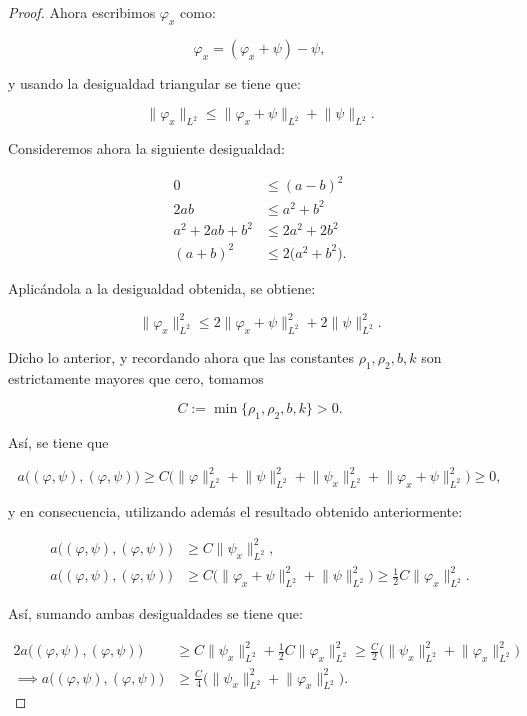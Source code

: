 \begin{proof}
    Ahora escribimos $\varphi_x$ como:

    \[\varphi_x = (\varphi_x + \psi) - \psi,\]

    y usando la desigualdad triangular se tiene que:

    \[\lVert \varphi_x \rVert_{L^2} \leq \lVert \varphi_x + \psi \rVert_{L^2} + \lVert \psi \rVert_{L^2}.\]

    Consideremos ahora la siguiente desigualdad:

    \begin{align*}
        0 &\leq (a - b)^2\\
        2ab &\leq a^2 + b^2\\
        a^2 + 2ab + b^2 &\leq 2a^2 + 2b^2\\
        (a+b)^2 &\leq 2\big(a^2 + b^2\big).
    \end{align*}

    Aplicándola a la desigualdad obtenida, se obtiene:

    \[\lVert \varphi_x \rVert^2_{L^2} \leq 2\lVert \varphi_x + \psi \rVert^2_{L^2} + 2\lVert \psi \rVert^2_{L^2}.\]

    Dicho lo anterior, y recordando ahora que las constantes $\rho_1, \rho_2, b, k$ son estrictamente mayores que cero, tomamos

    \[C := \min \{\rho_1, \rho_2, b, k\} > 0.\]

    Así, se tiene que

    \[a\big((\varphi, \psi), (\varphi, \psi)\big) \geq C \big( \lVert \varphi \rVert^2_{L^2} + \lVert \psi \rVert_{L^2}^2 + \lVert \psi_x \rVert^2_{L^2} + \lVert \varphi_x + \psi \rVert_{L^2}^2 \big) \geq 0,\]

    y en consecuencia, utilizando además el resultado obtenido anteriormente:

    \begin{align*}
        a\big((\varphi, \psi), (\varphi, \psi)\big) &\geq C \lVert \psi_x \rVert^2_{L^2},\\
        a\big((\varphi, \psi), (\varphi, \psi)\big) &\geq C\big(\lVert \varphi_x + \psi \rVert^2_{L^2} + \lVert \psi \rVert^2_{L^2} \big) \geq \frac{1}{2}C \lVert \varphi_x \rVert^2_{L^2}.
    \end{align*}

    Así, sumando ambas desigualdades se tiene que:

    \begin{align*}
        2a\big((\varphi, \psi), (\varphi, \psi)\big) &\geq C \lVert \psi_x \rVert^2_{L^2} + \frac{1}{2}C \lVert \varphi_x \rVert^2_{L^2} \geq \frac{C}{2}\big( \lVert \psi_x \rVert^2_{L^2} + \lVert \varphi_x \rVert^2_{L^2} \big)\\
        \implies a\big((\varphi, \psi), (\varphi, \psi)\big) &\geq \frac{C}{4}\big( \lVert \psi_x \rVert^2_{L^2} + \lVert \varphi_x \rVert^2_{L^2} \big).
    \end{align*}


\end{proof}
